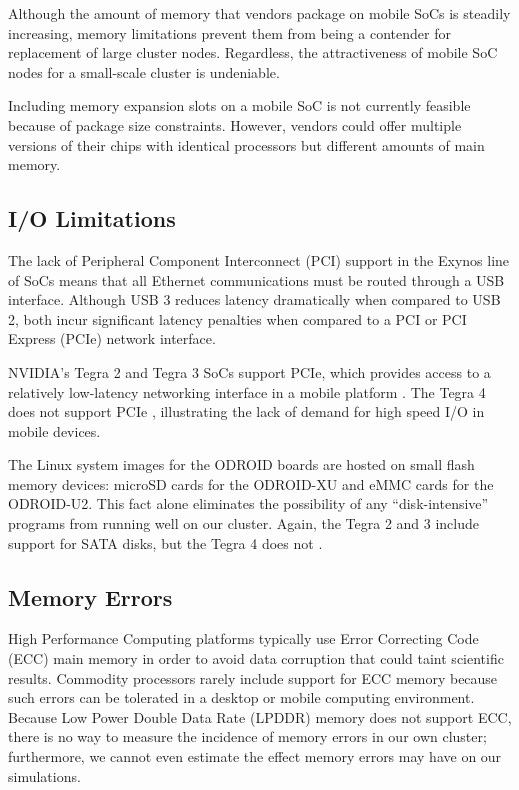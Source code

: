 \documentclass[11pt]{book}
\begin{document}
Although the amount of memory that vendors package on mobile SoCs is steadily increasing,
memory limitations prevent them from being a contender for replacement of large cluster
nodes.  Regardless, the attractiveness of mobile SoC nodes for a small-scale cluster is
undeniable.

Including memory expansion slots on a mobile SoC is not currently feasible because of
package size constraints.  However, vendors could offer multiple versions of their chips
with identical processors but different amounts of main memory.

\subsection{I/O Limitations}

The lack of Peripheral Component Interconnect (PCI) support in the Exynos line of SoCs
means that all Ethernet communications must be routed through a USB interface.  Although
USB 3 reduces latency dramatically when compared to USB 2, both incur significant latency
penalties when compared to a PCI or PCI Express (PCIe) network interface.

NVIDIA's Tegra 2 and Tegra 3 SoCs support PCIe, which provides access to a relatively
low-latency networking interface in a mobile platform \cite{rajovic-13}.  The Tegra 4 does
not support PCIe \cite{arstch-tegra}, illustrating the lack of demand for high speed I/O
in mobile devices.

The Linux system images for the ODROID boards are hosted on small flash memory devices:
microSD cards for the ODROID-XU and eMMC cards for the ODROID-U2.  This fact alone
eliminates the possibility of any ``disk-intensive'' programs from running well on our
cluster. Again, the Tegra 2 and 3 include support for SATA disks, but the Tegra 4 does not
\cite{arstch-tegra}.

\subsection{Memory Errors}

High Performance Computing platforms typically use Error Correcting Code (ECC) main memory
in order to avoid data corruption that could taint scientific results.  Commodity
processors rarely include support for ECC memory because such errors can be tolerated in a
desktop or mobile computing environment.  Because Low Power Double Data Rate (LPDDR)
memory does not support ECC, there is no way to measure the incidence of memory errors in
our own cluster; furthermore, we cannot even estimate the effect memory errors may have on
our simulations.
\end{document}
